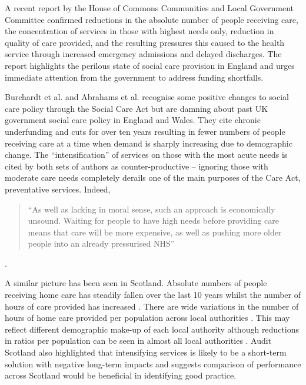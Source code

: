 \documentclass[12pt,]{report}
\begin{document}
A recent report by the House of Commons Communities and Local Government
Committee \citeyearpar{RN287} confirmed reductions in the absolute
number of people receiving care, the concentration of services in those
with highest needs only, reduction in quality of care provided, and the
resulting pressures this caused to the health service through increased
emergency admissions and delayed discharges. The report highlights the
perilous state of social care provision in England and urges immediate
attention from the government to address funding shortfalls.

Burchardt et al. \citeyearpar{RN173} and Abrahams et al.
\citeyearpar{RN177} recognise some positive changes to social care
policy through the Social Care Act but are damning about past UK
government social care policy in England and Wales. They cite chronic
underfunding and cuts for over ten years resulting in fewer numbers of
people receiving care at a time when demand is sharply increasing due to
demographic change. The ``intensification'' of services on those with
the most acute needs is cited by both sets of authors as
counter-productive -- ignoring those with moderate care needs completely
derails one of the main purposes of the Care Act, preventative services.
Indeed,

\begin{quotation}
    “As well as lacking in moral sense, such an approach is economically unsound. Waiting for people to have high needs before providing care means that care will be more expensive, as well as pushing more older people into an already pressurised NHS” \end{quotation}

\citep[pp.5]{RN177}.

A similar picture has been seen in Scotland. Absolute numbers of people
receiving home care has steadily fallen over the last 10 years whilst
the number of hours of care provided has increased \citep{RN128}. There
are wide variations in the number of hours of home care provided per
population across local authorities \citep{RN449, RN128}. This may
reflect different demographic make-up of each local authority although
reductions in ratios per population can be seen in almost all local
authorities \citep{RN128}. Audit Scotland \citeyearpar{RN449} also
highlighted that intensifying services is likely to be a short-term
solution with negative long-term impacts and suggests comparison of
performance across Scotland would be beneficial in identifying good
practice.
\end{document}
